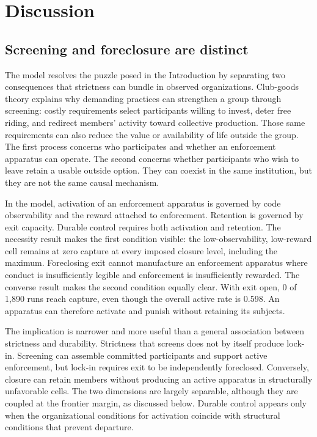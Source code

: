 \section{Discussion}

\subsection{Screening and foreclosure are distinct}

The model resolves the puzzle posed in the Introduction by separating two consequences that strictness can bundle in observed organizations. Club-goods theory explains why demanding practices can strengthen a group through screening: costly requirements select participants willing to invest, deter free riding, and redirect members' activity toward collective production. Those same requirements can also reduce the value or availability of life outside the group. The first process concerns who participates and whether an enforcement apparatus can operate. The second concerns whether participants who wish to leave retain a usable outside option. They can coexist in the same institution, but they are not the same causal mechanism.

In the model, activation of an enforcement apparatus is governed by code observability and the reward attached to enforcement. Retention is governed by exit capacity. Durable control requires both activation and retention. The necessity result makes the first condition visible: the low-observability, low-reward cell remains at zero capture at every imposed closure level, including the maximum. Foreclosing exit cannot manufacture an enforcement apparatus where conduct is insufficiently legible and enforcement is insufficiently rewarded. The converse result makes the second condition equally clear. With exit open, 0 of 1,890 runs reach capture, even though the overall active rate is 0.598. An apparatus can therefore activate and punish without retaining its subjects.

The implication is narrower and more useful than a general association between strictness and durability. Strictness that screens does not by itself produce lock-in. Screening can assemble committed participants and support active enforcement, but lock-in requires exit to be independently foreclosed. Conversely, closure can retain members without producing an active apparatus in structurally unfavorable cells. The two dimensions are largely separable, although they are coupled at the frontier margin, as discussed below. Durable control appears only when the organizational conditions for activation coincide with structural conditions that prevent departure.

